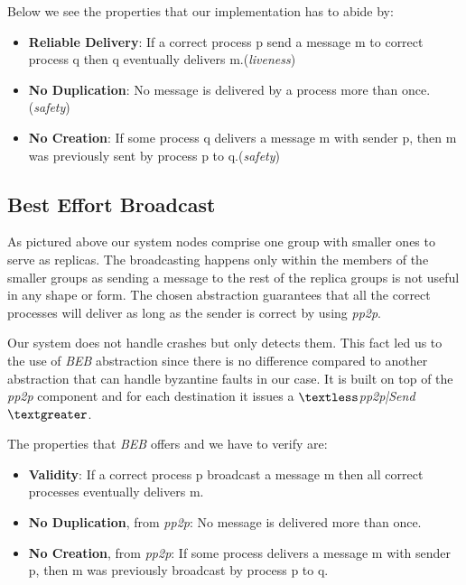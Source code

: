 \documentclass[a4paper, 11pt]{article}
\begin{document}
Below we see the properties that our implementation has to abide by:
\begin{itemize}
	\item \textbf{Reliable Delivery}: If a correct process p send a message m to correct process q then q eventually delivers m.(\textit{liveness})
	\item \textbf{No Duplication}: No message is delivered by a process more than once.(\textit{safety})
	\item \textbf{No Creation}: If some process q delivers a message m with sender p, then m was previously sent by process p to q.(\textit{safety})
\end{itemize}

\subsection{Best Effort Broadcast}

As pictured above our system nodes comprise one group with smaller ones to serve as replicas. The broadcasting happens only within the members of the smaller groups as sending a message to the rest of the replica groups is not useful in any shape or form. The chosen abstraction guarantees that all the correct processes will deliver as long as the sender is correct by using \textit{pp2p}. \par

Our system does not handle crashes but only detects them. This fact led us to the use of \textit{BEB} abstraction since there is no difference compared to another abstraction that can handle byzantine faults in our case. It is built on top of the \textit{pp2p} component and for each destination it issues a \textit{$\textless$pp2p|Send$\textgreater$}. \par

The properties that \textit{BEB} offers and we have to verify are:

\begin{itemize}
	\item \textbf{Validity}: If a correct process p broadcast a message m then all correct processes eventually delivers m.
	\item \textbf{No Duplication}, from \textit{pp2p}: No message is delivered more than once.
	\item \textbf{No Creation}, from \textit{pp2p}: If some process delivers a message m with sender p, then m was previously broadcast by process p to q.
\end{itemize}
\end{document}
